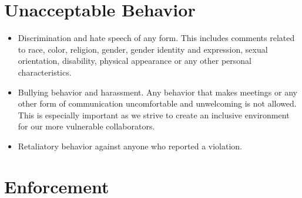 \documentclass[10pt]{article}
\begin{document}
\section{Unacceptable Behavior}
  \begin{itemize}
    \item Discrimination and hate speech of any form. This includes comments
      related to race, color, religion, gender, gender identity and expression, 
      sexual orientation, disability, physical appearance or any other personal 
      characteristics. 
    \item Bullying behavior and harassment. Any behavior that makes meetings 
      or any other form of communication uncomfortable and unwelcoming is not
      allowed.  This is especially important as we strive to create an 
      inclusive environment for our more vulnerable collaborators. 
    \item Retaliatory behavior against anyone who reported a violation. 
  \end{itemize}

\section{Enforcement}
\end{document}
